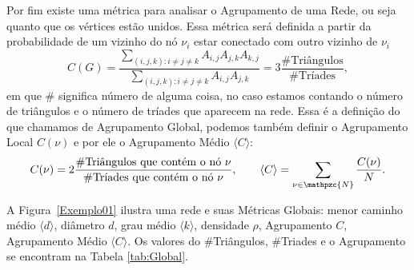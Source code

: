 Por fim existe uma métrica para analisar o Agrupamento de uma Rede, ou seja quanto que os vértices estão unidos. Essa métrica será definida a partir da probabilidade de um vizinho do nó $\nu_i$ estar conectado com outro vizinho de $\nu_i$
\begin{equation}
  C(G) = \frac{\sum\limits_{(i,j,k): i\neq j \neq k}A_{i,j}A_{j,k}A_{k,j}}{\sum\limits_{(i,j,k): i\neq j \neq k}A_{i,j}A_{j,k}} = 3\frac{\#\text{Triângulos}}{\#\text{Tríades}},
  \label{clustering2}
\end{equation}
em que $\#$ significa número de alguma coisa, no caso estamos contando o número de triângulos e o número de tríades que aparecem na rede. Essa é a definição do que chamamos de Agrupamento Global, podemos também definir o Agrupamento Local $C(\nu)$ e por ele o Agrupamento Médio $\langle C\rangle$:
\begin{equation}
  C(\nu) = 2\frac{\#\text{Triângulos que contém o nó }\nu}{\#\text{Tríades que contém o nó }\nu}, \qquad   \langle C \rangle = \sum\limits_{\nu \in \mathpzc{N}}\frac{C(\nu)}{N}.
  \label{clusteringlocal}
\end{equation}

A Figura~\ref{Exemplo01} ilustra uma rede e 
  suas Métricas Globais: menor caminho médio $\langle d \rangle$, diâmetro $d$, grau médio $\langle k \rangle$, densidade $\rho$, Agrupamento $C$, Agrupamento Médio $\langle C \rangle$. Os valores do \#Triângulos, \#Triades e o Agrupamento se encontram na Tabela \ref{tab:Global}.

